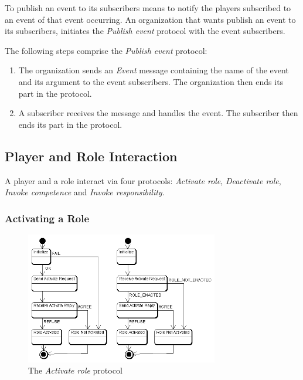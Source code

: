 To publish an event to its subscribers means to notify the players subscribed to an event of that event occurring.
An organization that wants publish an event to its subscribers, initiates the \textit{Publish event} protocol with the event subscribers.

The following steps comprise the \textit{Publish event} protocol:
\begin{enumerate}
	\item The organization sends an \textit{Event} message containing the name of the event and its argument to the event subscribers.
	The organization then ends its part in the protocol.
	\item A subscriber receives the message and handles the event.
	The subscriber then ends its part in the protocol.
\end{enumerate}

\subsection{Player and Role Interaction}

A player and a role interact via four protocols: \textit{Activate role}, \textit{Deactivate role}, \textit{Invoke competence} and \textit{Invoke responsibility}.

\subsubsection{Activating a Role}
\label{section:activating-a-role}

\begin{figure}[ht]
	\centering
	\includegraphics[width=0.75\textwidth]{images/thespian/activate-role-protocol.png}
	\caption{The \textit{Activate role} protocol}
	\label{figure:thespian-activate-role-protocol}
\end{figure}

